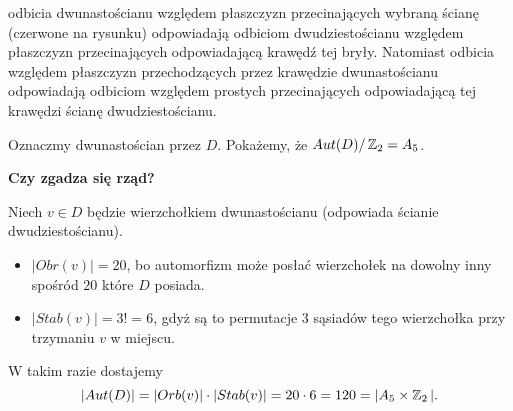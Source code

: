 odbicia dwunastościanu względem płaszczyzn przecinających wybraną ścianę (czerwone na rysunku) odpowiadają odbiciom dwudziestościanu względem płaszczyzn przecinających odpowiadającą krawędź tej bryły. Natomiast odbicia względem płaszczyzn przechodzących przez krawędzie dwunastościanu odpowiadają odbiciom względem prostych przecinających odpowiadającą tej krawędzi ścianę dwudziestościanu.



Oznaczmy dwunastościan przez $D$. Pokażemy, że $Aut(D)/\operatorname{\mathbb{Z}}_2=A_5$.

\textbf{Czy zgadza się rząd?}

Niech $v\in D$ będzie wierzchołkiem dwunastościanu (odpowiada ścianie dwudziestościanu). 
\begin{itemize}
  \item $|Obr(v)|=20$, bo automorfizm może posłać wierzchołek na dowolny inny spośród $20$ które $D$ posiada.
  \item $|Stab(v)| = 3!=6$, gdyż są to permutacje $3$ sąsiadów tego wierzchołka przy trzymaniu $v$ w miejscu.
\end{itemize}
W takim razie dostajemy
$$|Aut(D)|=|Orb(v)|\cdot|Stab(v)|=20\cdot 6=120=|A_5\times \operatorname{\mathbb{Z}}_2|.$$

\newpage

